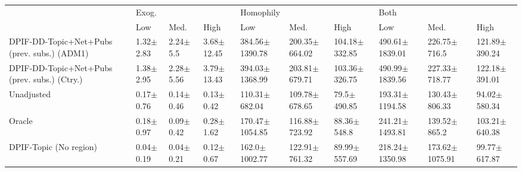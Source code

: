 \begin{tabular}{llllllllll}
\toprule
{} & \multicolumn{3}{l}{Exog.} & \multicolumn{3}{l}{Homophily} & \multicolumn{3}{l}{Both} \\
{} &            Low &           Med. &            High &                 Low &               Med. &               High &                 Low &                Med. &               High \\
\midrule
DPIF-DD-Topic+Net+Pubs (prev. subs.) (ADM1)  &  1.32$\pm$2.83 &   2.24$\pm$5.5 &  3.68$\pm$12.45 &  384.56$\pm$1390.78 &  200.35$\pm$664.02 &  104.18$\pm$332.85 &  490.61$\pm$1839.01 &    226.75$\pm$716.5 &  121.89$\pm$390.24 \\
DPIF-DD-Topic+Net+Pubs (prev. subs.) (Ctry.) &  1.38$\pm$2.95 &  2.28$\pm$5.56 &  3.79$\pm$13.43 &  394.03$\pm$1368.99 &  203.81$\pm$679.71 &  103.36$\pm$326.75 &  490.99$\pm$1839.56 &   227.33$\pm$718.77 &  122.18$\pm$391.01 \\
Unadjusted                                   &  0.17$\pm$0.76 &  0.14$\pm$0.46 &   0.13$\pm$0.42 &   110.31$\pm$682.04 &  109.78$\pm$678.65 &    79.5$\pm$490.85 &  193.31$\pm$1194.58 &   130.43$\pm$806.33 &   94.02$\pm$580.34 \\
Oracle                                       &  0.18$\pm$0.97 &  0.09$\pm$0.42 &   0.28$\pm$1.62 &  170.47$\pm$1054.85 &  116.88$\pm$723.92 &    88.36$\pm$548.8 &  241.21$\pm$1493.81 &    139.52$\pm$865.2 &  103.21$\pm$640.38 \\
DPIF-Topic (No region)                       &  0.04$\pm$0.19 &  0.04$\pm$0.21 &   0.12$\pm$0.67 &   162.0$\pm$1002.77 &  122.91$\pm$761.32 &   89.99$\pm$557.69 &  218.24$\pm$1350.98 &  173.62$\pm$1075.91 &   99.77$\pm$617.87 \\
\bottomrule
\end{tabular}
